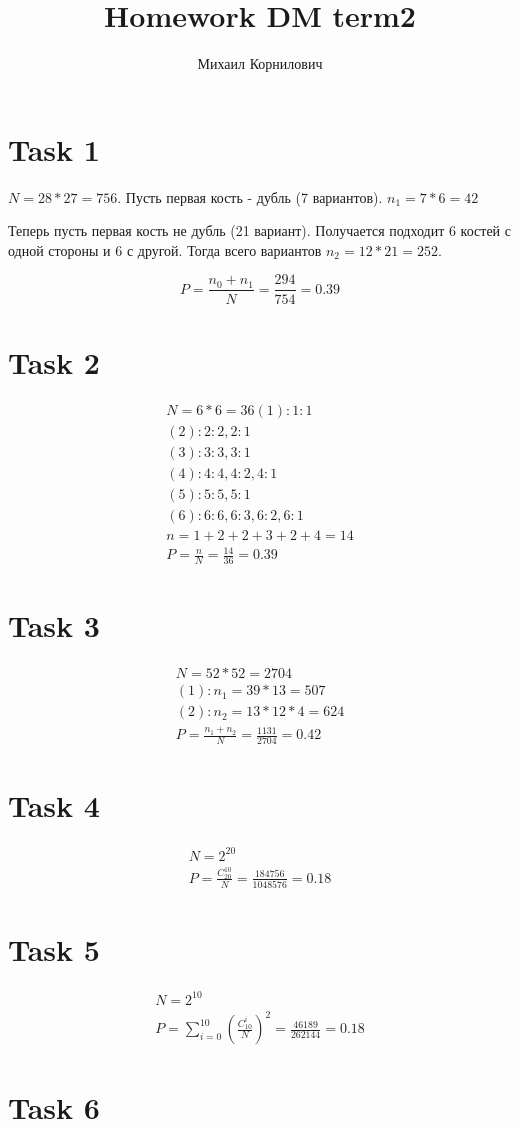 \documentclass{article}
\title{Homework DM term2}
\author{Михаил Корнилович}
\begin{document}
    \maketitle
    \newpage
	
	\section{Task 1}
	$N = 28 * 27 = 756$. Пусть первая кость - дубль (7 вариантов). $n_1 = 7 * 6 = 42$
	
	\noindent Теперь пусть первая кость не дубль (21 вариант). Получается подходит 6 костей с одной стороны и 6 с другой. Тогда всего вариантов $n_2 = 12 * 21 = 252$.
	
	$$
		P = \frac{n_0 + n_1}{N} = \frac{294}{754} = 0.39
	$$
	
	\section{Task 2}
	
	\begin{align*}
		N = 6 * 6 = 36
		(1): 1 : 1 \\
		(2): 2 : 2, 2 : 1 \\
		(3): 3 : 3, 3 : 1 \\
		(4): 4 : 4, 4 : 2, 4 : 1 \\
		(5): 5 : 5, 5 : 1 \\
		(6): 6 : 6, 6 : 3, 6 : 2, 6 : 1 \\
		n = 1 + 2 + 2 + 3 + 2 + 4 = 14 \\
		P = \frac{n}{N} = \frac{14}{36} = 0.39
	\end{align*}
	
	\section{Task 3}
	
	\begin{align*}
		N = 52 * 52 = 2704 \\
		(1): n_1 = 39 * 13 = 507 \\
		(2): n_2 = 13 * 12 * 4 = 624 \\
		P = \frac{n_1 + n_2}{N} = \frac{1131}{2704} = 0.42
	\end{align*}
	
	\section{Task 4}
	\begin{align*}
		N = 2^{20} \\
		P = \frac{C_{20}^{10}}{N} = \frac{184756}{1048576} = 0.18
	\end{align*}
	
	\section{Task 5}
	\begin{align*}
		N = 2^{10} \\
		P = \sum\limits_{i = 0}^{10}(\frac{C_{10}^{i}}{N})^2 = \frac{46189}{262144} = 0.18
	\end{align*}

    \section{Task 6}
    \begin{align*}
        
    \end{align*}
\end{document}
